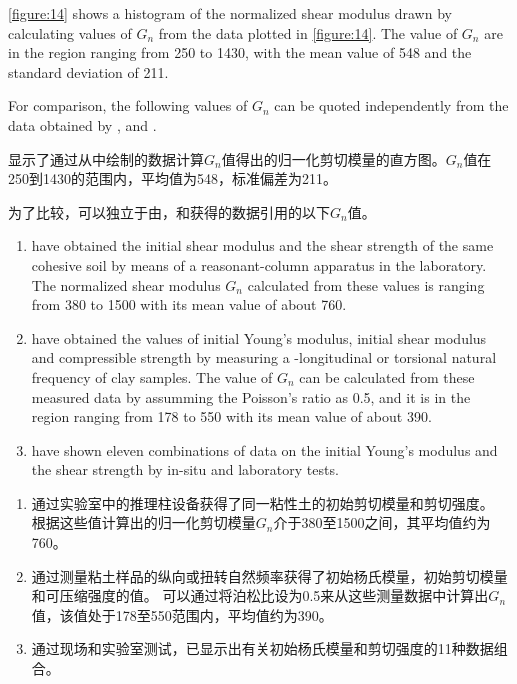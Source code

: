 \begin{paracol}{2}
    
    \autoref{figure:14} shows a histogram of the normalized shear modulus drawn by calculating values of $G_n$ from the data plotted in \autoref{figure:14}. The value of $G_n$ are in the region ranging from 250 to 1430, with the mean value of 548 and the standard deviation of 211.
    
    For comparison, the following values of $G_n$ can be quoted independently from the data obtained by \citet{Hardin1973667}, \citet{Wilson2010419} and \citet{DAppolonia19711359}.

    \switchcolumn

    显示了通过从中绘制的数据计算$G_n$值得出的归一化剪切模量的直方图。$G_n$值在250到1430的范围内，平均值为548，标准偏差为211。
    
    为了比较，可以独立于由\citet{Hardin1973667}，\citet{Wilson2010419}和\citet{DAppolonia19711359}获得的数据引用的以下$G_n$值。

    \switchcolumn*
    
    \begin{enumerate}
        \item \citet{Hardin1973667} have obtained the initial shear modulus and the shear strength of the same cohesive soil by means of a reasonant-column apparatus in the laboratory. The normalized shear modulus $G_n$ calculated from these values is ranging from 380 to 1500 with its mean value of about 760.
        \item \citet{Wilson2010419} have obtained the values of initial Young's modulus, initial shear modulus and compressible strength by measuring a -longitudinal or torsional natural frequency of clay samples. The value of $G_n$ can be calculated from these measured data by assumming the Poisson's ratio as 0.5, and it is in the region ranging from 178 to 550 with its mean value of about 390.
        \item \citet{DAppolonia19711359} have shown eleven combinations of data on the initial Young's modulus and the shear strength by in-situ and laboratory tests. 
    \end{enumerate}      

    \switchcolumn
    
    \begin{enumerate}         
        \item \citet{Hardin1973667}通过实验室中的推理柱设备获得了同一粘性土的初始剪切模量和剪切强度。 根据这些值计算出的归一化剪切模量$G_n$介于380至1500之间，其平均值约为760。
        \item \citet{Wilson2010419}通过测量粘土样品的纵向或扭转自然频率获得了初始杨氏模量，初始剪切模量和可压缩强度的值。 可以通过将泊松比设为0.5来从这些测量数据中计算出$G_n$值，该值处于178至550范围内，平均值约为390。
        \item \citet{DAppolonia19711359}通过现场和实验室测试，已显示出有关初始杨氏模量和剪切强度的11种数据组合。
    \end{enumerate}


\end{paracol}
